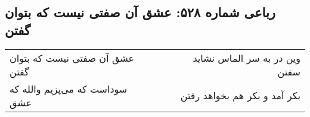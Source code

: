 \begin{center}
\section*{رباعی شماره ۵۲۸: عشق آن صفتی نیست که بتوان گفتن}
\label{sec:sh528}
\begin{longtable}{l p{0.5cm} r}
عشق آن صفتی نیست که بتوان گفتن
&&
وین در به سر الماس نشاید سفتن
\\
سوداست که می‌پزیم والله که عشق
&&
بکر آمد و بکر هم بخواهد رفتن
\\
\end{longtable}
\end{center}
